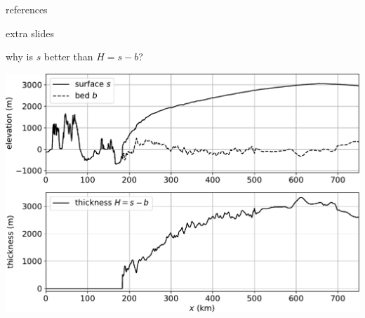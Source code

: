 \documentclass[10pt,dvipsnames]{beamer}
\begin{document}
\begin{frame}{references}

{\footnotesize }
\end{frame}


\begin{frame}[standout]

extra slides
\end{frame}


\begin{frame}{why is $s$ better than $H=s-b$?}

\begin{center}
\includegraphics[height=0.84\textheight]{giscross}
\end{center}
\end{frame}
\end{document}
